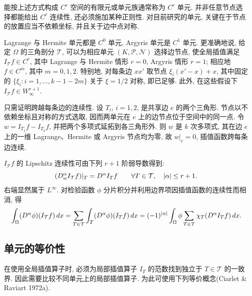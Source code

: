 \begin{Remark}
\label{rem:ch03-cr-element}
能按上述方式构成 $C^r$ 空间的有限元或单元族通常称为 $C^r$ 单元. 并非任意节点选择都能给出 $C^r$ 连续性, 还必须施加某种正则性. 对目前研究的单元, 关键在于节点的放置应当不依赖坐标, 并且关于边中点对称.
\end{Remark}

\begin{Proposition}
\label{prop:ch03-lagrange-hermite-argyris-continuity}
Lagrange 与 Hermite 单元都是 $C^0$ 单元, Argyris 单元是 $C^1$ 单元. 更准确地说, 给定 $\Omega$ 的三角剖分 $\mathcal T$, 可以为相应单元 $(K,\mathcal P,\mathcal N)$ 选择边节点, 使全局插值满足 $I_{\mathcal T}f\in C^r$, 其中 Lagrange 与 Hermite 情形 $r=0$, Argyris 情形 $r=1$; 相应地 $f\in C^m$, 其中 $m=0,1,2$. 特别地, 对每条边 $xx'$ 取节点 $\xi_i(x'-x)+x$, 其中固定的 $\{\xi_i:i=1,\ldots,k-1-2m\}$ 关于 $\xi=1/2$ 对称, 即已足够. 此外, 在这些假设下 $I_{\mathcal T}f\in W^{r+1}_\infty$.
\end{Proposition}
\begin{Proof}
只需证明跨越每条边的连续性. 设 $T_i$, $i=1,2$, 是共享边 $e$ 的两个三角形. 节点以不依赖坐标且对称的方式选取, 因而两单元在 $e$ 上的边节点位于空间中的同一点. 令 $w=I_{T_1}f-I_{T_2}f$, 并把两个多项式延拓到各三角形外. 则 $w$ 是 $k$ 次多项式, 其在边 $e$ 上的一维 Lagrange、Hermite 或 Argyris 节点均为零, 故 $w|_e=0$, 插值函数跨每条边连续.

$I_{\mathcal T}f$ 的 Lipschitz 连续性可由下列 $r+1$ 阶弱导数得到:
\[
\MathBookFormulaID{formula-ch03-global-interpolant-weak-derivatives}
(D_w^\alpha I_{\mathcal T}f)|_T=D^\alpha I_Tf
\qquad\forall T\in\mathcal T,\quad |\alpha|\leq r+1.
\]
右端显然属于 $L^\infty$. 对检验函数 $\phi$ 分片积分并利用边界项因插值函数的连续性而相消, 得
\[
\MathBookFormulaID{formula-ch03-global-interpolant-weak-derivative-verification}
\int_\Omega(D^\alpha\phi)(I_{\mathcal T}f)\,dx
=\sum_{T\in\mathcal T}\int_T(D^\alpha\phi)(I_Tf)\,dx
=(-1)^{|\alpha|}\int_\Omega\phi\sum_{T\in\mathcal T}\chi_T(D^\alpha I_Tf)\,dx.
\]
\end{Proof}
\subsection{单元的等价性}
\label{sec:ch03-element-equivalence}
\setcounter{thmcount}{0}
\setcounter{equation}{0}

在使用全局插值算子时, 必须为局部插值算子 $I_T$ 的范数找到独立于 $T\in\mathcal T$ 的一致界. 因此需要比较不同单元上的局部插值算子. 为此可使用下列等价概念(Ciarlet \& Raviart 1972a).

